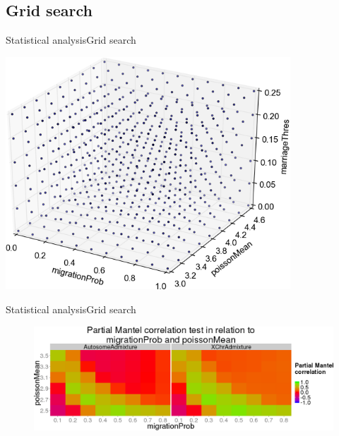 \documentclass[10pt, aspectratio=43]{beamer}
\begin{document}
\subsection{Grid search}
\begin{frame}{Statistical analysis}{Grid search}
\begin{center}
  \includegraphics[width=0.8\textwidth]{../data/grid.png}
\end{center}
\end{frame}

\begin{frame}{Statistical analysis}{Grid search}
\begin{center}
  \begin{figure}
    \includegraphics[width=1\textwidth]{../data/sensit-comp-2d-preview.png}
  \end{figure}
\end{center}
\end{frame}
\end{document}
